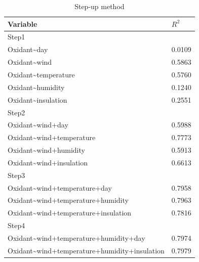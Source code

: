 \documentclass{article}
\begin{document}
        \begin{table}[H]
    \begin{center}
    \begin{tabular}{|ll|}
        \hline
        Variable & $R^2$ \\
        \hline 
        Step1&\\
        \hline
        Oxidant\textasciitilde day & 0.0109 \\
        Oxidant\textasciitilde wind & 0.5863 \\
        Oxidant\textasciitilde temperature & 0.5760 \\
        Oxidant\textasciitilde humidity & 0.1240 \\
        Oxidant\textasciitilde insulation & 0.2551 \\
        \hline
        Step2&\\
        \hline 
        Oxidant\textasciitilde wind+day & 0.5988 \\
        Oxidant\textasciitilde wind+temperature & 0.7773 \\
        Oxidant\textasciitilde wind+humidity & 0.5913 \\
        Oxidant\textasciitilde wind+insulation & 0.6613 \\
        \hline
        Step3&\\
        \hline 
        Oxidant\textasciitilde wind+temperature+day & 0.7958 \\
        Oxidant\textasciitilde wind+temperature+humidity & 0.7963 \\
        Oxidant\textasciitilde wind+temperature+insulation & 0.7816 \\
        \hline
        Step4&\\
        \hline
        Oxidant\textasciitilde wind+temperature+humidity+day &  0.7974\\
        Oxidant\textasciitilde wind+temperature+humidity+insulation & 0.7979\\
        \hline
    \end{tabular}
    \caption{Step-up method}
    \label{table:step-up2}
    \end{center}
    \end{table}
    
\end{document}
